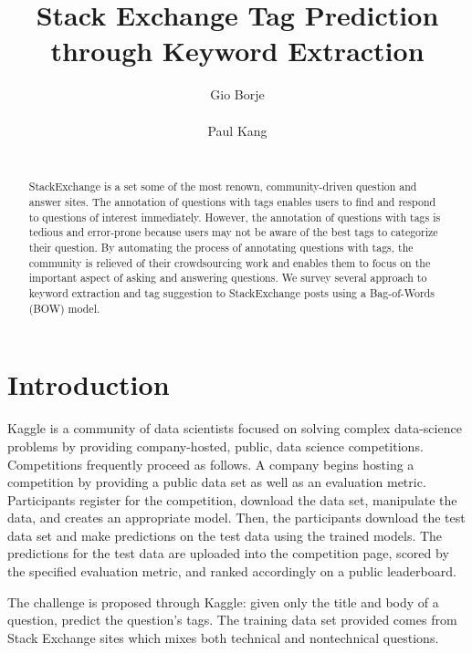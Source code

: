 \documentclass{sig-alternate}
\begin{document}
\title{Stack Exchange Tag Prediction through Keyword Extraction}
\author{
	\alignauthor
	Gio Borje \\
	 \\
	\alignauthor
	Paul Kang \\
	 \\
}
\maketitle

\begin{abstract}
	StackExchange is a set some of the most renown, community-driven
	question and answer sites. The annotation of questions with tags
	enables users to find and respond to questions of interest
	immediately. However, the annotation of questions with tags is tedious
	and error-prone because users may not be aware of the best tags to
	categorize their question. By automating the process of annotating
	questions with tags, the community is relieved of their crowdsourcing
	work and enables them to focus on the important aspect of asking and
	answering questions. We survey several approach to keyword extraction
	and tag suggestion to StackExchange posts using a Bag-of-Words (BOW)
	model.
\end{abstract}

\section{Introduction} %
\label{sec:Introduction}
	Kaggle is a community of data scientists focused on solving complex
	data-science problems by providing company-hosted, public, data
	science competitions. Competitions frequently proceed as follows. A
	company begins hosting a competition by providing a public data set as
	well as an evaluation metric. Participants register for the
	competition, download the data set, manipulate the data, and creates
	an appropriate model. Then, the participants download the test data
	set and make predictions on the test data using the trained models.
	The predictions for the test data are uploaded into the competition
	page, scored by the specified evaluation metric, and ranked
	accordingly on a public leaderboard.

	The challenge is proposed through Kaggle: given only the title and
	body of a question, predict the question's tags. The training data set
	provided comes from Stack Exchange sites which mixes both technical
	and nontechnical questions. 
\end{document}
